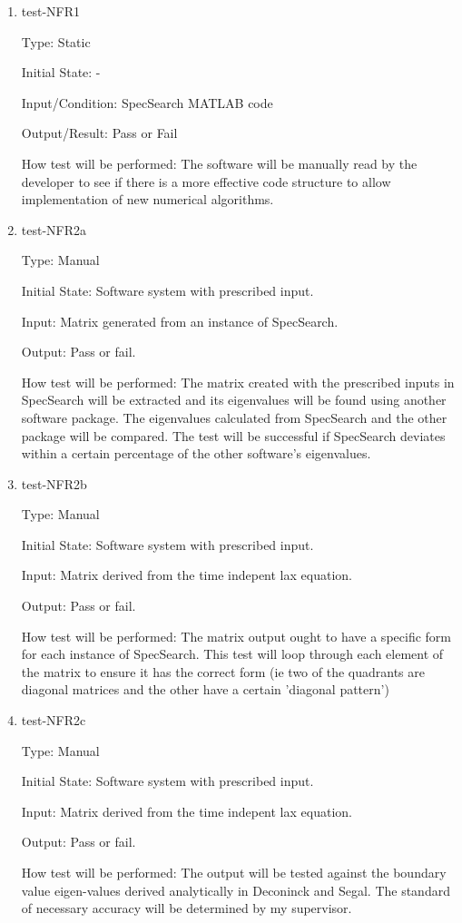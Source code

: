 \documentclass[12pt, titlepage]{article}
\begin{document}
\begin{enumerate}

\item{test-NFR1\\}

Type: Static
					
Initial State: -
					
Input/Condition: SpecSearch MATLAB code
					
Output/Result: Pass or Fail
					
How test will be performed: The software will be manually read by the developer 
to see if there is a more effective code structure to allow implementation of 
new numerical algorithms. 
					
\item{test-NFR2a\\}

Type: Manual
					
Initial State: Software system with prescribed input.
					
Input: Matrix generated from an instance of SpecSearch.
					
Output: Pass or fail.
					
How test will be performed: The matrix created with the prescribed inputs in 
SpecSearch will be extracted and its eigenvalues will be found using another 
software package. The eigenvalues calculated from SpecSearch and the other 
package will be compared. The test will be successful if SpecSearch deviates 
within a certain percentage of the other software's eigenvalues.

\item{test-NFR2b\\} 

Type: Manual 

Initial State: Software system with prescribed input.

Input: Matrix derived from the time indepent lax equation.

Output: Pass or fail.

How test will be performed: The matrix output ought to have a specific form for 
each instance of SpecSearch. This test will loop through each element of the 
matrix to ensure it has the correct form (ie two of the quadrants are diagonal 
matrices and the other have a certain 'diagonal pattern') 

\item{test-NFR2c\\} 

Type: Manual 

Initial State: Software system with prescribed input.

Input: Matrix derived from the time indepent lax equation.

Output: Pass or fail.

How test will be performed: The output will be tested against the boundary 
value eigen-values derived analytically in Deconinck and Segal. The standard of 
necessary accuracy will be determined by my supervisor.  

\end{enumerate}
\end{document}
